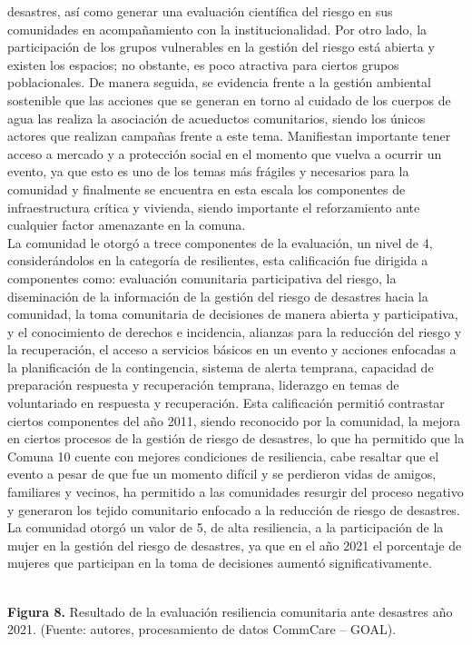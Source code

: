 \documentclass[
  letterpaper,
]{book}
\makeatletter
\newcommand*\pandocbounded[1]{%
  \sbox\pandoc@box{#1}%
  \Gscale@div\@tempa{\textheight}{\dimexpr\ht\pandoc@box+\dp\pandoc@box\relax}%
  \Gscale@div\@tempb{\linewidth}{\wd\pandoc@box}%
  \ifdim\@tempb\p@<\@tempa\p@\let\@tempa\@tempb\fi%
  \ifdim\@tempa\p@<\p@\scalebox{\@tempa}{\usebox\pandoc@box}%
  \else\usebox{\pandoc@box}%
  \fi%
}
\makeatother
\begin{document}
desastres, así como generar una evaluación científica del riesgo en sus
comunidades en acompañamiento con la institucionalidad. Por otro lado,
la participación de los grupos vulnerables en la gestión del riesgo está
abierta y existen los espacios; no obstante, es poco atractiva para
ciertos grupos poblacionales. De manera seguida, se evidencia frente a
la gestión ambiental sostenible que las acciones que se generan en torno
al cuidado de los cuerpos de agua las realiza la asociación de
acueductos comunitarios, siendo los únicos actores que realizan campañas
frente a este tema. Manifiestan importante tener acceso a mercado y a
protección social en el momento que vuelva a ocurrir un evento, ya que
esto es uno de los temas más frágiles y necesarios para la comunidad y
finalmente se encuentra en esta escala los componentes de
infraestructura crítica y vivienda, siendo importante el reforzamiento
ante cualquier factor amenazante en la comuna.\\
La comunidad le otorgó a trece componentes de la evaluación, un nivel de
4, considerándolos en la categoría de resilientes, esta calificación fue
dirigida a componentes como: evaluación comunitaria participativa del
riesgo, la diseminación de la información de la gestión del riesgo de
desastres hacia la comunidad, la toma comunitaria de decisiones de
manera abierta y participativa, y el conocimiento de derechos e
incidencia, alianzas para la reducción del riesgo y la recuperación, el
acceso a servicios básicos en un evento y acciones enfocadas a la
planificación de la contingencia, sistema de alerta temprana, capacidad
de preparación respuesta y recuperación temprana, liderazgo en temas de
voluntariado en respuesta y recuperación. Esta calificación permitió
contrastar ciertos componentes del año 2011, siendo reconocido por la
comunidad, la mejora en ciertos procesos de la gestión de riesgo de
desastres, lo que ha permitido que la Comuna 10 cuente con mejores
condiciones de resiliencia, cabe resaltar que el evento a pesar de que
fue un momento difícil y se perdieron vidas de amigos, familiares y
vecinos, ha permitido a las comunidades resurgir del proceso negativo y
generaron los tejido comunitario enfocado a la reducción de riesgo de
desastres.\\
La comunidad otorgó un valor de 5, de alta resiliencia, a la
participación de la mujer en la gestión del riesgo de desastres, ya que
en el año 2021 el porcentaje de mujeres que participan en la toma de
decisiones aumentó significativamente.

\pandocbounded{\texttt{[image: index\_files/mediabag/wNnGGhuWgjVLwAAAABJR.png]}}\\
\textbf{Figura 8.} Resultado de la evaluación resiliencia comunitaria
ante desastres año 2021. (Fuente: autores, procesamiento de datos
CommCare -- GOAL).
\end{document}
